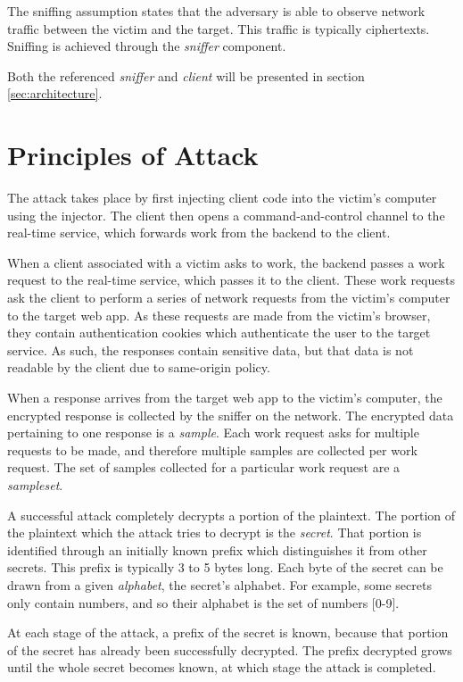 The sniffing assumption states that the adversary is able to observe network
traffic between the victim and the target. This traffic is typically
ciphertexts. Sniffing is achieved through the \textit{sniffer} component.

Both the referenced \textit{sniffer} and \textit{client} will be presented in section 
\ref{sec:architecture}.



\section{Principles of Attack}\label{sec:principles}


The attack takes place by first injecting client code into the victim's
computer using the injector. The client then opens a command-and-control
channel to the real-time service, which forwards work from the backend to the
client.

When a client associated with a victim asks to work, the backend passes a work
request to the real-time service, which passes it to the client. These work
requests ask the client to perform a series of network requests from the
victim's computer to the target web app. As these requests are made from the
victim's browser, they contain authentication cookies which authenticate the
user to the target service. As such, the responses contain sensitive data, but
that data is not readable by the client due to same-origin policy.

When a response arrives from the target web app to the victim's computer, the
encrypted response is collected by the sniffer on the network. The encrypted
data pertaining to one response is a \textit{sample}. Each work request asks for
multiple requests to be made, and therefore multiple samples are collected per
work request. The set of samples collected for a particular work request are a
\textit{sampleset}.

A successful attack completely decrypts a portion of the plaintext. The portion
of the plaintext which the attack tries to decrypt is the \textit{secret}. That
portion is identified through an initially known prefix which distinguishes it
from other secrets. This prefix is typically 3 to 5 bytes long. Each byte of
the secret can be drawn from a given \textit{alphabet}, the secret's alphabet. For
example, some secrets only contain numbers, and so their alphabet is the set of
numbers [0-9].

At each stage of the attack, a prefix of the secret is known, because that
portion of the secret has already been successfully decrypted. The prefix
decrypted grows until the whole secret becomes known, at which stage the attack
is completed.

